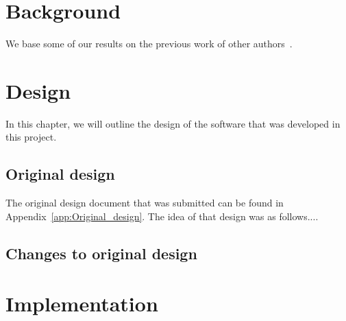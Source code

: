 \documentclass[a4paper,11pt]{report}
\begin{document}

\chapter{Background}\label{chap:background}

We base some of our results on the previous work of other authors~\cite{A1, Someone}.



\chapter{Design}\label{chap:design}

In this chapter, we will outline the design of the software that was
developed in this project.  

\section{Original design}\label{chap:first_design}
The original design document that was submitted can be found in 
Appendix~\ref{app:Original_design}.  The idea of that design
was as follows....


\section{Changes to original design}



\chapter{Implementation}\label{chap:implementation}
\end{document}
